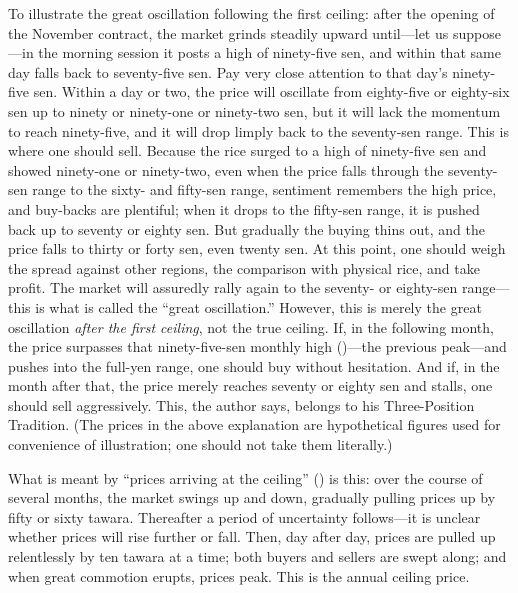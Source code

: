 \commentary
To illustrate the great oscillation following the first ceiling: after
the opening of the November contract, the market grinds steadily upward
until---let us suppose---in the morning session it posts a high of
ninety-five sen, and within that same day falls back to seventy-five sen.
Pay very close attention to that day's ninety-five sen. Within a day or
two, the price will oscillate from eighty-five or eighty-six sen up to
ninety or ninety-one or ninety-two sen, but it will lack the momentum to
reach ninety-five, and it will drop limply back to the seventy-sen range.
This is where one should sell. Because the rice surged to a high of
ninety-five sen and showed ninety-one or ninety-two, even when the price
falls through the seventy-sen range to the sixty- and fifty-sen range,
sentiment remembers the high price, and buy-backs are plentiful; when it
drops to the fifty-sen range, it is pushed back up to seventy or eighty
sen. But gradually the buying thins out, and the price falls to thirty
or forty sen, even twenty sen. At this point, one should weigh the
spread against other regions, the comparison with physical rice, and take
profit. The market will assuredly rally again to the seventy- or
eighty-sen range---this is what is called the ``great oscillation.''
However, this is merely the great oscillation \textit{after the first
ceiling}, not the true ceiling. If, in the following month, the price
surpasses that ninety-five-sen monthly high ()---the
previous peak---and pushes into the full-yen range, one should buy
without hesitation. And if, in the month after that, the price merely
reaches seventy or eighty sen and stalls, one should sell aggressively.
This, the author says, belongs to his Three-Position Tradition. (The
prices in the above explanation are hypothetical figures used for
convenience of illustration; one should not take them literally.)


\begin{sokyubox}
{\small\itshape\color{sokyubar} }

\medskip
What is meant by ``prices arriving at the ceiling''
() is this: over the course
of several months, the market swings up and down, gradually pulling
prices up by fifty or sixty tawara. Thereafter a period of uncertainty
follows---it is unclear whether prices will rise further or fall. Then,
day after day, prices are pulled up relentlessly by ten tawara at a
time; both buyers and sellers are swept along; and when great commotion
erupts, prices peak. This is the annual ceiling price.
\end{sokyubox}

